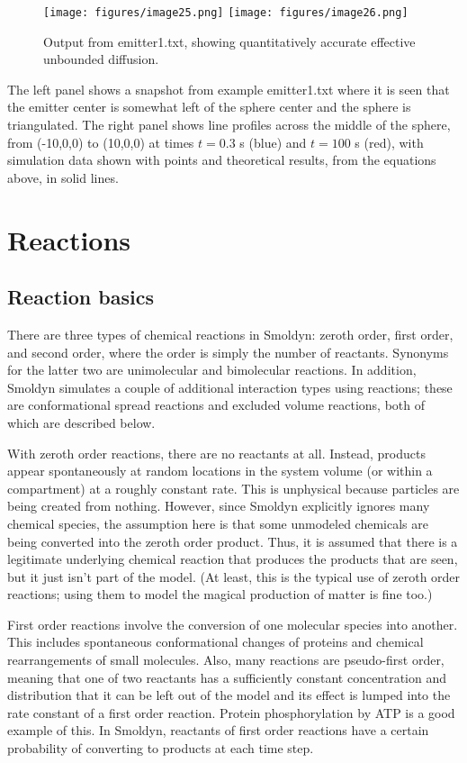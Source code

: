 \documentclass {scrbook}
\begin{document}
\begin{figure}[h]
\centering
\texttt{[image: figures/image25.png]}
\texttt{[image: figures/image26.png]}
\caption{Output from emitter1.txt, showing quantitatively accurate effective unbounded diffusion.}
\label{fig:emitter1}
\end{figure}

The left panel shows a snapshot from example emitter1.txt where it is seen that the emitter center is somewhat left of the sphere center and the sphere is triangulated. The right panel shows line profiles across the middle of the sphere, from (-10,0,0) to (10,0,0) at times $t = 0.3$ s (blue) and $t = 100$ s (red), with simulation data shown with points and theoretical results, from the equations above, in solid lines.


\chapter{Reactions}

\section{Reaction basics}

There are three types of chemical reactions in Smoldyn: zeroth order, first order, and second order, where the order is simply the number of reactants. Synonyms for the latter two are unimolecular and bimolecular reactions. In addition, Smoldyn simulates a couple of additional interaction types using reactions; these are conformational spread reactions and excluded volume reactions, both of which are described below.

With zeroth order reactions, there are no reactants at all. Instead, products appear spontaneously at random locations in the system volume (or within a compartment) at a roughly constant rate. This is unphysical because particles are being created from nothing. However, since Smoldyn explicitly ignores many chemical species, the assumption here is that some unmodeled chemicals are being converted into the zeroth order product. Thus, it is assumed that there is a legitimate underlying chemical reaction that produces the products that are seen, but it just isn't part of the model. (At least, this is the typical use of zeroth order reactions; using them to model the magical production of matter is fine too.)

First order reactions involve the conversion of one molecular species into another. This includes spontaneous conformational changes of proteins and chemical rearrangements of small molecules. Also, many reactions are pseudo-first order, meaning that one of two reactants has a sufficiently constant concentration and distribution that it can be left out of the model and its effect is lumped into the rate constant of a first order reaction. Protein phosphorylation by ATP is a good example of this. In Smoldyn, reactants of first order reactions have a certain probability of converting to products at each time step.
\end{document}
